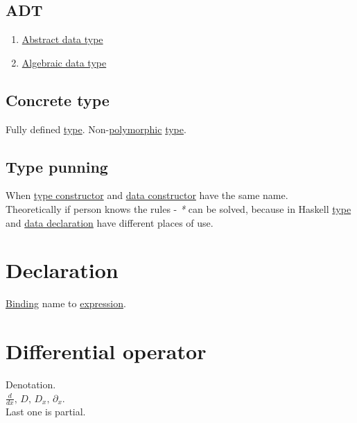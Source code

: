 \documentclass[a4paper,14pt,oneside]{book}
\begin{document}
\section{\label{org9437842}ADT}
\label{sec:org7a8ef23}
\begin{enumerate}
\item \hyperref[orgb971030]{Abstract data type}\\
\item \hyperref[org4a96d49]{Algebraic data type}\\
\end{enumerate}

\section{\label{org5af03e0}Concrete type}
\label{sec:org233cb5a}
Fully defined \hyperref[org35b9249]{type}. Non-\hyperref[orga6475c9]{polymorphic} \hyperref[org35b9249]{type}.\\

\section{\label{org046fa52}Type punning}
\label{sec:org9713790}
When \hyperref[org4e996fb]{type constructor} and \hyperref[orgfbbfa22]{data constructor} have the same name.\\

Theoretically if person knows the rules - \emph{*} can be solved, because in Haskell \hyperref[org35b9249]{type} and \hyperref[orgf5ac897]{data declaration} have different places of use.\\

\chapter{\label{orgd4ba3e1}Declaration}
\label{sec:org6dd2392}
\hyperref[orgf4d58db]{Binding} name to \hyperref[orgade06d7]{expression}.\\

\chapter{\label{orgd9d8f42}Differential operator}
\label{sec:orgdcc1134}
Denotation.\\
\(\frac{d}{dx}, \, D, \, D_{x}, \, \partial_{x}.\)\\
Last one is partial.\\
\end{document}
